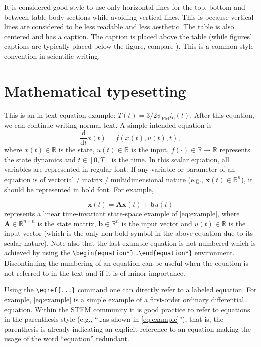  It is considered good style to use only horizontal lines for the top, bottom and between table body sections while avoiding vertical lines. This is because vertical lines are considered to be less readable and less aesthetic. The table is also centered and has a caption. The caption is placed above the table (while figures' captions are typically placed below the figure, compare ). This is a common style convention in scientific writing. 



\section{Mathematical typesetting}
\label{subsec:normalization}
This is an in-text equation example: $T(t)=3/2\psi_{\mathrm{PM}}i_{\mathrm{q}}(t)$. After this equation, we can continue writing normal text. A simple intended equation is
\begin{equation}
	\label{eq:example}
	\frac{\mathrm{d}}{\mathrm{d}t}x(t) = f(x(t),u(t),t),
\end{equation}
where $x(t)\in\mathbb{R}$ is the state, $u(t)\in\mathbb{R}$ is the input, $f(\cdot)\in\mathbb{R}\rightarrow\mathbb{R}$ represents the state dynamics and $t\in\left[0,T\right]$ is the time. In this scalar equation, all variables are represented in regular font. If any variable or parameter of an equation is of vectorial / matrix / multidimensional nature (e.g., $\bm{x}(t)\in\mathbb{R}^n$), it should be represented in bold font. For example,

\begin{equation*}
	\bm{x}(t) = \bm{A}\bm{x}(t) + \bm{b}u(t)
\end{equation*}
represents a linear time-invariant state-space example of  \eqref{eq:example}, where $\bm{A}\in\mathbb{R}^{n\times n}$ is the state matrix, $\bm{b}\in\mathbb{R}^{n}$ is the input vector and $u(t)\in\mathbb{R}$ is the input vector (which is the only non-bold symbol in the above equation due to its scalar nature). Note also that the last example equation is not numbered which is achieved by using the \verb|\begin{equation*}|\ldots\verb|\end{equation*}| environment. Discontinuing the numbering of an equation can be useful when the equation is not referred to in the text and if it is of minor importance.




\begin{infobox}
Using the \verb|\eqref{...}| command one can directly refer to a labeled equation. For example, \eqref{eq:example} is a simple example of a first-order ordinary differential equation. Within the STEM community it is good practice to refer to equations in the parenthesis style (e.g., \enquote{\ldots as shown in \eqref{eq:example}}), that is, the parenthesis is already indicating an explicit reference to an equation making the usage of the word \enquote{equation} redundant. 
\end{infobox}


